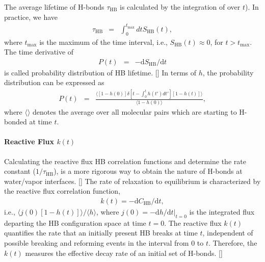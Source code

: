 The average lifetime of H-bonds $\tau_{\text{HB}}$ is calculated by the integration of \SHB over $t$). In practice, we have 
\begin{eqnarray}
  \tau_{\text{HB}} &=& \int_0^{t_{\text{max}}} dt S_{\text{HB}}(t),
\label{eq:calculate_hb_lifetime}
\end{eqnarray}
where $t_{\text{max}}$ is the maximum of the time interval, i.e., $S_{\text{HB}}(t)\approx 0$, for $t > t_{\text{max}}$.
%
The time derivative of \SHB
\begin{eqnarray}
P(t) &=& -\text{d}S_{\text{HB}}/\text{d}t
\label{eq:P_of_t}
\end{eqnarray}
is called probability distribution of HB lifetime. [\cite{Sciortino1990prl,FWS99}]
In terms of $h$, the probability distribution can be expressed as
\begin{eqnarray}
P(t) &=& \frac{\langle [1-h(0)]\delta [t-\int_0^t h(t')dt'][1-h(t)]\rangle}{\langle 1-h(0)\rangle},
\label{eq:P_of_t}
\end{eqnarray}
where $\langle \rangle$ denotes the average over all molecular pairs which are starting to H-bonded at time $t$.

%
\paragraph{Reactive Flux $k(t)$} 
Calculating the reactive flux HB correlation functions and determine the rate constant ($1/\tau_{\text{HB}}$),
is a more rigorous way to obtain the nature of H-bonds at water/vapor interfaces. [\cite{AL00}]
The rate of relaxation to equilibrium is characterized by the reactive flux correlation function, 
\begin{eqnarray}
k(t) = -\text{d}C_{\text{HB}}/\text{d}t,
\label{eq:k}
\end{eqnarray}
i.e., $\langle j(0)[1-h(t)]\rangle/\langle h\rangle$,
where 
$j(0)=-\text{d}h/\text{d}t|_{t=0}$ 
is the integrated flux departing the HB configuration space at time $t=0$.
The reactive flux $k(t)$ quantifies the rate that an initially present HB breaks at time $t$, 
independent of possible breaking and reforming events in the interval from 0 to $t$.
Therefore, the $k(t)$ measures the effective decay rate of an 
initial set of H-bonds. [\cite{FWS00, DC87}]

